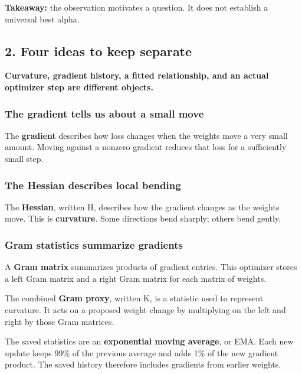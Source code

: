 \documentclass[
  14pt,
  letterpaper,
]{extarticle}
\let\reportsubsubsection\subsubsection
\renewcommand{\subsubsection}{\Needspace{5\baselineskip}\reportsubsubsection}
\begin{document}
\textbf{Takeaway:} the observation motivates a question. It does not
establish a universal best alpha.


\subsection{2. Four ideas to keep
separate}\label{four-ideas-to-keep-separate}

\textbf{Curvature, gradient history, a fitted relationship, and an
actual optimizer step are different objects.}

\subsubsection{The gradient tells us about a small
move}\label{the-gradient-tells-us-about-a-small-move}

The \textbf{gradient} describes how loss changes when the weights move a
very small amount. Moving against a nonzero gradient reduces that loss
for a sufficiently small step.

\subsubsection{The Hessian describes local
bending}\label{the-hessian-describes-local-bending}

The \textbf{Hessian}, written H, describes how the gradient changes as
the weights move. This is \textbf{curvature}. Some directions bend
sharply; others bend gently.

\subsubsection{Gram statistics summarize
gradients}\label{gram-statistics-summarize-gradients}

A \textbf{Gram matrix} summarizes products of gradient entries. This
optimizer stores a left Gram matrix and a right Gram matrix for each
matrix of weights.

The combined \textbf{Gram proxy}, written K, is a statistic used to
represent curvature. It acts on a proposed weight change by multiplying
on the left and right by those Gram matrices.

The saved statistics are an \textbf{exponential moving average}, or EMA.
Each new update keeps 99\% of the previous average and adds 1\% of the
new gradient product. The saved history therefore includes gradients
from earlier weights.
\end{document}
